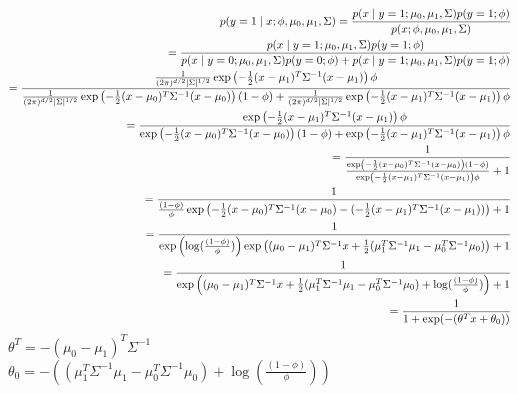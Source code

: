 \begin{answer}
\begin{eqnarray*}
p(y = 1\mid x; \phi, \mu_0, \mu_1, \Sigma)
=\frac{p(x \mid y = 1;\mu_0, \mu_1, \Sigma)p(y=1;\phi)}{p(x;\phi, \mu_0, \mu_1, \Sigma)}\\
=\frac{p(x \mid y = 1;\mu_0, \mu_1, \Sigma)p(y=1;\phi)}{p(x \mid y = 0;\mu_0, \mu_1, \Sigma)p(y=0;\phi)+p(x \mid y = 1;\mu_0, \mu_1, \Sigma)p(y=1;\phi)}\\
=\frac{\frac{1}{(2\pi)^{{d}/2} |\Sigma|^{1/2}}\exp\left(-\frac{1}{2}(x-\mu_1)^T \Sigma^{-1} (x-\mu_1) \right)\phi}{\frac{1}{(2\pi)^{{d}/2} |\Sigma|^{1/2}}\exp\left(-\frac{1}{2}(x-\mu_{0})^T \Sigma^{-1} (x-\mu_{0})\right)(1-\phi)+\frac{1}{(2\pi)^{{d}/2} |\Sigma|^{1/2}}\exp\left(-\frac{1}{2}(x-\mu_1)^T \Sigma^{-1} (x-\mu_1) \right)\phi}\\
=\frac{\exp\left(-\frac{1}{2}(x-\mu_1)^T \Sigma^{-1} (x-\mu_1) \right)\phi}{\exp\left(-\frac{1}{2}(x-\mu_{0})^T \Sigma^{-1} (x-\mu_{0})\right)(1-\phi)+\exp\left(-\frac{1}{2}(x-\mu_1)^T \Sigma^{-1} (x-\mu_1) \right)\phi}\\
=\frac{1}{\frac{\exp\left(-\frac{1}{2}(x-\mu_{0})^T \Sigma^{-1} (x-\mu_{0})\right)(1-\phi)}{\exp\left(-\frac{1}{2}(x-\mu_1)^T \Sigma^{-1} (x-\mu_1) \right)\phi}+1}\\
=\frac{1}{\frac{(1-\phi)}{\phi}\exp\left(-\frac{1}{2}(x-\mu_{0})^T \Sigma^{-1} (x-\mu_{0})-(-\frac{1}{2}(x-\mu_1)^T \Sigma^{-1} (x-\mu_1))\right)+1}\\
=\frac{1}{\exp\left(\log(\frac{(1-\phi)}{\phi})\right)\exp\left((\mu_0-\mu_1)^T\Sigma^{-1}x+\frac{1}{2}(\mu_1^T\Sigma^{-1}\mu_1-\mu_0^T\Sigma^{-1}\mu_0)\right)+1}\\
=\frac{1}{\exp\left((\mu_0-\mu_1)^T\Sigma^{-1}x+\frac{1}{2}(\mu_1^T\Sigma^{-1}\mu_1-\mu_0^T\Sigma^{-1}\mu_0)+\log(\frac{(1-\phi)}{\phi})\right)+1}\\
= \frac{1}{1 + \exp(-(\theta^T x + \theta_0))}
\end{eqnarray*}
${\theta^T=-(\mu_0-\mu_1)^T\Sigma^{-1}}$\\
${\theta_0=-\left((\mu_1^T\Sigma^{-1}\mu_1-\mu_0^T\Sigma^{-1}\mu_0)+\log(\frac{(1-\phi)}{\phi})\right)}$
\end{answer}

